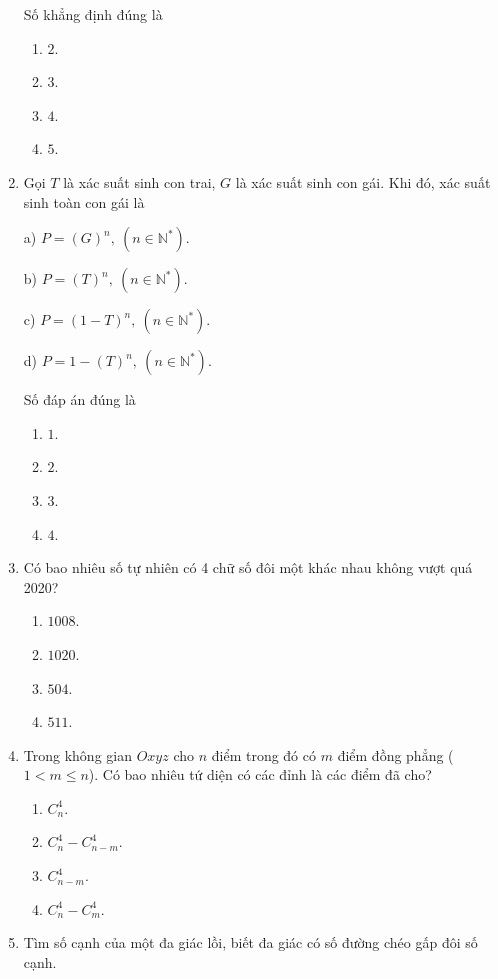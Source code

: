 \begin{enumerate}[label=\textbf{Câu \arabic*.},align=left,left=0cm..0cm,itemindent=*]
	Số khẳng định đúng là
	\begin{enumerate}[label=\textbf{\Alph*.},align=left,left=1cm..0cm,itemindent=*]
		\item $2$. \item $3$. \item $4$. \item $5$.
	\end{enumerate}
	\item Gọi $T$ là xác suất sinh con trai, $G$ là xác suất sinh con gái. Khi đó, xác suất sinh toàn con gái là\par
	a) $P=(G)^n,~(n\in\mathbb{N}^*)$.\par
	b) $P=(T)^n,~(n\in\mathbb{N}^*)$.\par
	c) $P=(1-T)^n,~(n\in\mathbb{N}^*)$.\par
	d) $P=1-(T)^n,~(n\in\mathbb{N}^*)$.\par
	Số đáp án đúng là
	\begin{enumerate}[label=\textbf{\Alph*.},align=left,left=1cm..0cm,itemindent=*]
		\item $1$. \item $2$. \item $3$. \item $4$.
	\end{enumerate}
	\item Có bao nhiêu số tự nhiên có 4 chữ số đôi một khác nhau không vượt quá 2020?
	\begin{enumerate}[label=\textbf{\Alph*.},align=left,left=1cm..0cm,itemindent=*]
		\item $1008$. \item $1020$. \item $504$. \item $511$.
	\end{enumerate}
	\item Trong không gian $Oxyz$ cho $n$ điểm trong đó có $m$ điểm đồng phẳng ($1<m\leqslant n$). Có bao nhiêu tứ diện có các đỉnh là các điểm đã cho?
	\begin{enumerate}[label=\textbf{\Alph*.},align=left,left=1cm..0cm,itemindent=*]
		\item $C_{n}^{4}$.
		\item $C_{n}^{4}-C_{n-m}^{4}$.
		\item $C_{n-m}^{4}$.
		\item $C_{n}^{4}-C_{m}^{4}$.
	\end{enumerate}
	\item Tìm số cạnh của một đa giác lồi, biết đa giác có số đường chéo gấp đôi số cạnh.

\end{enumerate}
